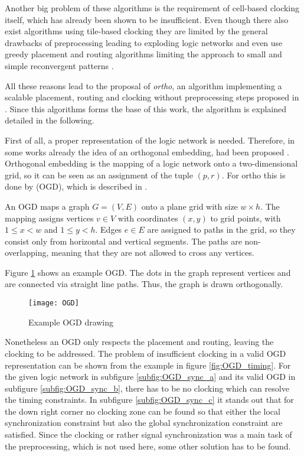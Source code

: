 Another big problem of these algorithms is the requirement of cell-based clocking itself, which has already been shown to be insufficient. Even though there also exist algorithms using tile-based clocking they are limited by the general drawbacks of preprocessing \cite{trindade2016placement} leading to exploding logic networks and even use greedy placement and routing algorithms limiting the approach to small and simple reconvergent patterns \cite{QCA-LG}.

All these reasons lead to the proposal of \textit{ortho}, an algorithm implementing a scalable placement, routing and clocking without preprocessing steps proposed in \cite{ortho}. Since this algorithms forms the base of this work, the algorithm is explained detailed in the following.

First of all, a proper representation of the logic network is needed. Therefore, in some works already the idea of an orthogonal embedding, had been proposed \cite{dummy_and_buffer_nodes}. Orthogonal embedding is the mapping of a logic network onto a two-dimensional grid, so it can be seen as an assignment of the tuple $(p, r)$. For ortho this is done by  (OGD), which is described in \cite{OGD}.

\begin{definition}
	An OGD maps a graph $G = (V, E)$ onto a plane grid with size $w \times h$. The mapping assigns vertices $v \in V$ with coordinates $(x, y)$ to grid points, with $1 \leq x < w$ and $1 \leq y < h$. Edges $e \in E$ are assigned to paths in the grid, so they consist only from horizontal and vertical segments. The paths are non-overlapping, meaning that they are not allowed to cross any vertices.
\end{definition}

Figure \ref{fig:OGD_example} shows an example OGD. The dots in the graph represent vertices and are connected via straight line paths. Thus, the graph is drawn orthogonally.

\begin{figure}
	\centering
	\texttt{[image: OGD]}
	\caption{Example OGD drawing}\label{fig:OGD_example}
\end{figure}

Nonetheless an OGD only respects the placement and routing, leaving the clocking to be addressed. The problem of insufficient clocking in a valid OGD representation can be shown from the example in figure \ref{fig:OGD_timing}. For the given logic network in subfigure \ref{subfig:OGD_sync_a} and its valid OGD in subfigure \ref{subfig:OGD_sync_b}, there has to be no clocking which can resolve the timing constraints. In subfigure \ref{subfig:OGD_sync_c} it stands out that for the down right corner no clocking zone can be found so that either the local synchronization constraint but also the global synchronization constraint are satisfied. Since the clocking or rather signal synchronization was a main task of the preprocessing, which is not used here, some other solution has to be found.

